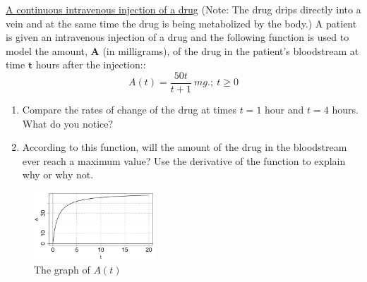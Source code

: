 \begin{example}
\underline{A continuous intravenous injection of a drug} (Note:  The drug drips directly into a vein and at the same time the drug is being metabolized by the body.)  A patient is given an intravenous injection of a drug  and the following function is used to model the amount, $\bm{A}$ (in milligrams), of the drug in the patient’s bloodstream at time $\bm{t}$ hours after the injection::
\begin{equation*}
    A(t)=\frac{50t}{t+1}\ mg.;\ t\ge 0
\end{equation*}
\renewcommand{\labelenumi}{(\alph{enumi})}
\begin{enumerate}[leftmargin=*]
    \item 	Compare the rates of change of the drug at times $t=1$ hour and $t=4$ hours.  What do you notice?
    \item According to this function, will the amount of the drug in the bloodstream ever reach a maximum value?  Use the derivative of the function to explain why or why not. 
\end{enumerate}
    \begin{sol}
 \begin{figure}[h]
 \centering
    \includegraphics[width=0.4\textwidth]{images/productQuotient/Afunction.png}
    \caption{The graph of $A(t)$}
    \label{fig:Afunction}
    \end{figure}
    

\end{sol}
\end{example}

